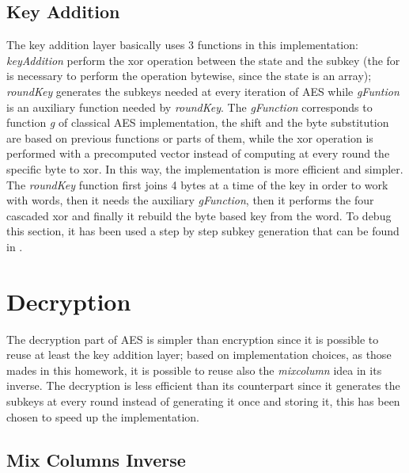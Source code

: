 \documentclass{article}
\begin{document}
\subsection{Key Addition}

The key addition layer basically uses 3 functions in this implementation: \textit{keyAddition} perform the xor operation between the state and the subkey (the for is necessary to perform the operation bytewise, since the state is an array); \textit{roundKey} generates the subkeys needed at every iteration of AES while \textit{gFuntion} is an auxiliary function needed by \textit{roundKey}. \newline
The \textit{gFunction} corresponds to function \textit{g} of classical AES implementation, the shift and the byte substitution are based on previous functions or parts of them, while the xor operation is performed with a precomputed vector instead of computing at every round the specific byte to xor. In this way, the implementation is more efficient and simpler.\newline
The \textit{roundKey} function first joins 4 bytes at a time of the key in order to work with words, then it needs the auxiliary \textit{gFunction}, then it performs the four cascaded xor and finally it rebuild the byte based key from the word.\newline
To debug this section, it has been used a step by step subkey generation that can be found in \cite{AESsteps}.   


\section{Decryption}

The decryption part of AES is simpler than encryption since it is possible to reuse at least the key addition layer; based on implementation choices, as those mades in this homework, it is possible to reuse also the \textit{mixcolumn} idea in its inverse. The decryption is less efficient than its counterpart since it generates the subkeys at every round instead of generating it once and storing it, this has been chosen to speed up the implementation.
 
\subsection{Mix Columns Inverse}
\end{document}
